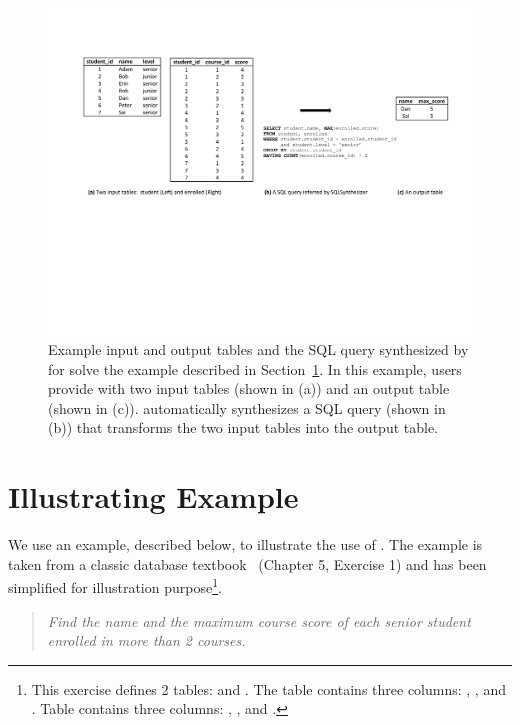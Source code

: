 
\begin{figure}[t]
  \centering
  \includegraphics[scale=0.75]{motivating}
  \vspace*{-4.0ex}\caption {{\label{fig:motivating}
  Example input and output tables and the SQL query synthesized by
  \ourtool for solve the example described in Section~\ref{sec:example}. In this example, users provide \ourtool with
  two input tables (shown in (a)) and an output table (shown in (c)).
  \ourtool automatically synthesizes a SQL query (shown in (b)) that
  transforms the two input tables into the output table.
}}
\end{figure}

\section{Illustrating Example}
\label{sec:example}

We use an example, described below, to illustrate the use
of \ourtool. The example is taken from a classic
database textbook~\cite{cowbook} (Chapter 5, Exercise 1)
and has been simplified for illustration purpose\footnote{
This exercise defines 2 tables: 
and . The  table
contains three columns: , ,
and . Table  contains
three columns: , ,
and .
}.

\begin{quote}
\textit{Find the name and the maximum course score of each senior student
enrolled in more than 2 courses.}
\end{quote}

